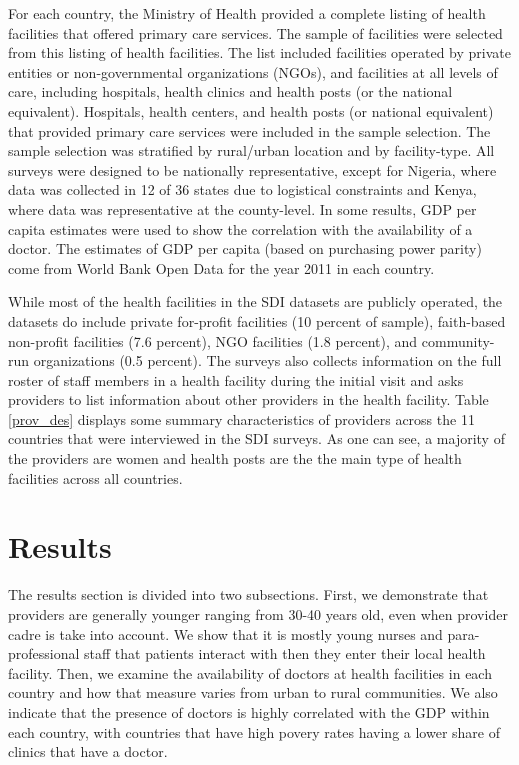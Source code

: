\documentclass{article}                 %
\begin{document}
	For each country, the Ministry of Health provided a complete listing of health facilities that offered primary care services. The sample of facilities were selected from this listing of health facilities. The list included facilities operated by private entities or non-governmental organizations (NGOs), and facilities at all levels of care, including hospitals, health clinics and health posts (or the national equivalent). Hospitals, health centers, and health posts (or national equivalent) that provided primary care services were included in the sample selection. The sample selection was stratified by rural/urban location and by facility-type. All surveys were designed to be nationally representative, except for Nigeria, where data was collected in 12 of 36 states due to logistical constraints and Kenya, where data was representative at the county-level. In some results, GDP per capita  estimates were used to show the correlation with the availability of a doctor. The estimates of GDP per capita (based on purchasing power parity) come from World Bank Open Data for the year 2011 in each country. \cite{wbgdp} 
	
	While most of the health facilities in the SDI datasets are publicly operated, the datasets do  include private for-profit facilities (10 percent of sample), faith-based non-profit facilities (7.6 percent), NGO facilities (1.8 percent), and community-run organizations (0.5 percent). The surveys also  collects information on the full roster of staff members in a health facility during the initial visit and asks providers to list information about other providers in the health facility. Table \ref{prov_des} displays some summary characteristics of providers across the 11 countries that were interviewed in the SDI surveys.  As one can see, a majority of the providers are women and health posts are the the main type of  health facilities across all countries.  
	
	\section{Results}
	
	The results section is divided into two subsections. First, we demonstrate that providers are generally younger ranging from 30-40 years old, even when provider cadre is take into account. We show that it is mostly young nurses and para-professional staff that patients interact with then they enter their local health facility. Then, we examine the availability of doctors at health facilities in each country and how that measure varies from urban to rural communities. We also indicate that the presence of doctors is highly correlated with the GDP  within each country, with countries that have high povery rates having a lower share of clinics that have a doctor. 
	
\end{document}

